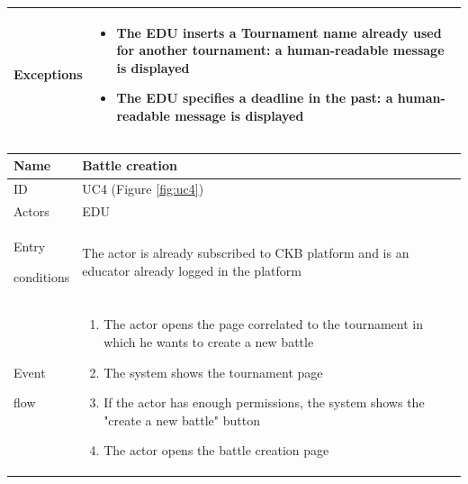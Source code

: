 \begin{center}
\begin{tabular}{| m{2cm} | m{10cm}|}
        Exceptions            & \begin{itemize}
                                    \item The EDU inserts a Tournament name already used for another tournament: a human-readable message is displayed
                                    \item The EDU specifies a deadline in the past: a human-readable message is displayed
                                \end{itemize}                                                                                                                                   \\ \hline
    \end{tabular}
\end{center}

\begin{center}
    \def\arraystretch{1.5}
    \begin{tabular}{| m{2cm} | m{10cm}|}
        \hline
        Name                  & Battle creation                                                                                           \\ \hline
        ID                    & UC4 (Figure \ref{fig:uc4})                                                                                                                          \\ \hline
        Actors                & EDU                                                                                                                             \\ \hline
        Entry \par conditions & The actor is already subscribed to CKB platform and is an educator already logged in the platform                        \\ \hline
        Event \par flow       & \begin{enumerate}
                                    \item The actor opens the page correlated to the tournament in which he wants to create a new battle
                                    \item The system shows the tournament page
                                    \item If the actor has enough permissions, the system shows the "create a new battle" button
                                    \item The actor opens the battle creation page

\end{enumerate}
\end{tabular}
\end{center}
